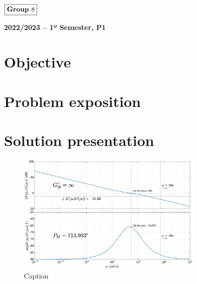 \documentclass[12pt]{article}
\begin{document}
\begin{flushleft}
    \large $\boxed{\text{\bf Group} \ 8}$\\[4.0cm]
\end{flushleft}
    
\begin{center}
    \large \bf 2022/2023 -- 1º Semester, P1
\end{center}

\thispagestyle{empty}

\setcounter{page}{0}

\newpage

\tableofcontents 

\newpage

\section{Objective}

\lipsum[1] \cite{refs1}

\section{Problem exposition} 

\lipsum[1] \cite{refs2}

\lipsum[2-3]

\newpage

\section{Solution presentation}

\lipsum[1]

\begin{figure}[H]
	\begin{center}
 		\includegraphics[width = 0.8\textwidth]{Images/Image.eps}
 		\caption{Caption}
 		\label{fig1:graph}
	\end{center} 
\end{figure}
\end{document}
